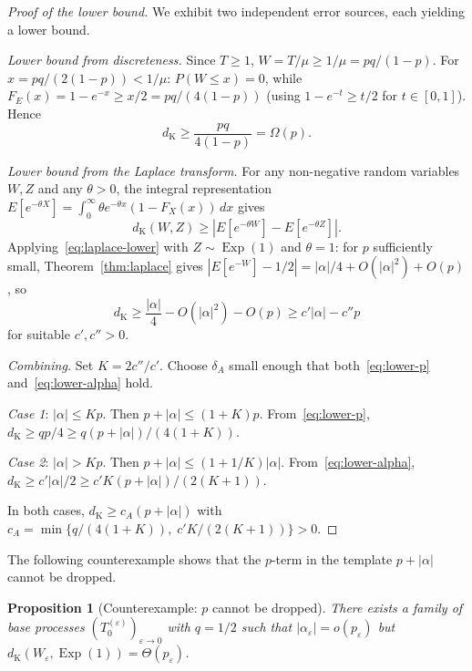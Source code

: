\documentclass[11pt]{article}
\theoremstyle{plain}
\newtheorem{proposition}[theorem]{Proposition}
\theoremstyle{definition}
\theoremstyle{remark}
\DeclareMathOperator{\Exp}{Exp}
\newcommand{\dK}{d_{\mathrm{K}}}
\begin{document}
\begin{proof}[Proof of the lower bound]
We exhibit two independent error sources, each yielding a lower bound.

\emph{Lower bound from discreteness.}\;
Since $T \geq 1$, $W = T/\mu \geq 1/\mu = pq/(1-p)$.  For $x = pq/(2(1-p)) < 1/\mu$: $P(W \leq x) = 0$, while $F_E(x) = 1 - e^{-x} \geq x/2 = pq/(4(1-p))$ (using $1 - e^{-t} \geq t/2$ for $t \in [0,1]$).  Hence
\begin{equation}\label{eq:lower-p}
  \dK \geq \frac{pq}{4(1-p)} = \Omega(p).
\end{equation}

\emph{Lower bound from the Laplace transform.}\;
For any non-negative random variables $W, Z$ and any $\theta > 0$, the integral representation $E[e^{-\theta X}] = \int_0^\infty \theta e^{-\theta x}(1-F_X(x))\,dx$ gives
\begin{equation}\label{eq:laplace-lower}
  \dK(W, Z) \geq |E[e^{-\theta W}] - E[e^{-\theta Z}]|.
\end{equation}
Applying~\eqref{eq:laplace-lower} with $Z \sim \Exp(1)$ and $\theta = 1$: for $p$ sufficiently small, Theorem~\ref{thm:laplace} gives $|E[e^{-W}] - 1/2| = |\alpha|/4 + O(|\alpha|^2) + O(p)$, so
\begin{equation}\label{eq:lower-alpha}
  \dK \geq \frac{|\alpha|}{4} - O(|\alpha|^2) - O(p) \geq c'|\alpha| - c''p
\end{equation}
for suitable $c', c'' > 0$.

\emph{Combining.}\;
Set $K = 2c''/c'$.  Choose $\delta_A$ small enough that both~\eqref{eq:lower-p} and~\eqref{eq:lower-alpha} hold.

\emph{Case 1}: $|\alpha| \leq Kp$.  Then $p + |\alpha| \leq (1+K)p$.  From~\eqref{eq:lower-p}, $\dK \geq qp/4 \geq q(p+|\alpha|)/(4(1+K))$.

\emph{Case 2}: $|\alpha| > Kp$.  Then $p + |\alpha| \leq (1+1/K)|\alpha|$.  From~\eqref{eq:lower-alpha}, $\dK \geq c'|\alpha|/2 \geq c'K(p+|\alpha|)/(2(K+1))$.

In both cases, $\dK \geq c_A(p + |\alpha|)$ with $c_A = \min\{q/(4(1+K)),\; c'K/(2(K+1))\} > 0$.
\end{proof}

The following counterexample shows that the \(p\)-term in the template \(p+|\alpha|\) cannot be dropped.

\begin{proposition}[Counterexample: $p$ cannot be dropped]\label{prop:counterex}
There exists a family of base processes $(T_0^{(\varepsilon)})_{\varepsilon \to 0}$ with $q = 1/2$ such that $|\alpha_\varepsilon| = o(p_\varepsilon)$ but $\dK(W_\varepsilon, \Exp(1)) = \Theta(p_\varepsilon)$.
\end{proposition}
\end{document}
